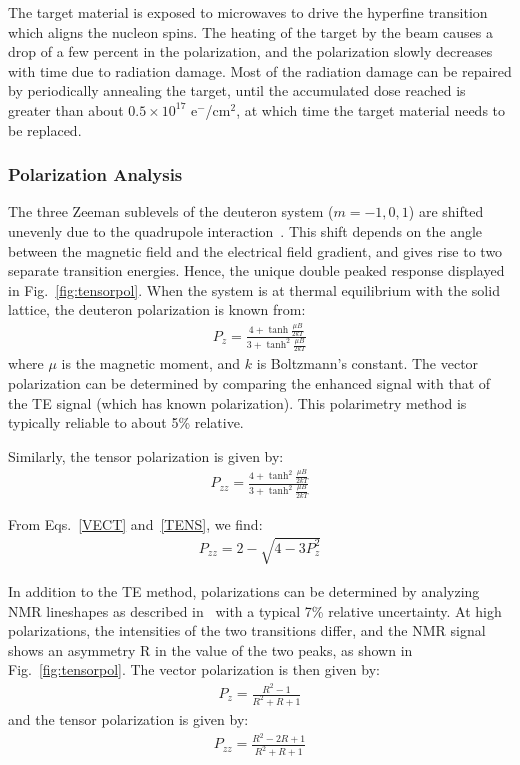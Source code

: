 The target material is exposed to microwaves
to drive the hyperfine transition which  aligns the nucleon spins. 
 The heating of the target by the beam causes a drop of a few percent in
the polarization, and the polarization slowly decreases with time due to radiation
damage. Most of the radiation damage can be repaired by periodically annealing the target,
until the accumulated dose reached is greater than about 
 $0.5\times 10^{17}$ e$^-$/cm$^2$,
at
which time the target material needs to be replaced. 

\subsubsection{Polarization Analysis} 
The three Zeeman sublevels of the deuteron system ($m=-1,0,1$) are
shifted unevenly due to the quadrupole interaction~\cite{Meyer:1985dta}. This shift
depends on the angle between the magnetic field and the electrical field gradient, and gives rise to two separate transition
energies. Hence, the unique double peaked response displayed in Fig.~\ref{fig:tensorpol}.
When the system is at thermal equilibrium with the solid lattice, the deuteron polarization is known from:
\begin{eqnarray}
\label{VECT}
P_z = \frac{4+\tanh\frac{\mu B}{2 k T}} {3+\tanh^2\frac{\mu B}{2 k T}    }
\end{eqnarray}
where $\mu$ is the magnetic moment, and $k$ is Boltzmann's constant.  The vector polarization can be determined by comparing
the enhanced signal with that of the TE signal (which has known polarization).  This polarimetry method is typically reliable to about 5\% relative.

Similarly, the tensor polarization is given by: 
\begin{eqnarray}
\label{TENS}
P_{zz} = \frac{4+\tanh^2\frac{\mu B}{2 k T}} {3+\tanh^2\frac{\mu B}{2 k T}    }
\end{eqnarray}

From Eqs.~\ref{VECT} and~\ref{TENS}, we find:
\begin{eqnarray*}
P_{zz}= 2 - \sqrt{4-3 P_z^2}
\end{eqnarray*}


In addition to the TE method, polarizations can be determined by analyzing NMR lineshapes as described in~\cite{Dulya:1997qc} with a typical  7\% relative uncertainty.  At high polarizations, the
intensities of the two transitions differ, and the NMR signal shows an asymmetry R in the
value of the two peaks, as shown in Fig.~\ref{fig:tensorpol}.  The vector polarization is then given by:
\begin{eqnarray}
\label{RVECT}
P_{z} = \frac{R^2-1}{R^2+R+1}
\end{eqnarray}
and the tensor polarization is given by:
\begin{eqnarray}
\label{TVECT}P_{zz} = \frac{R^2-2 R +1}{R^2+R+1}
\end{eqnarray}


